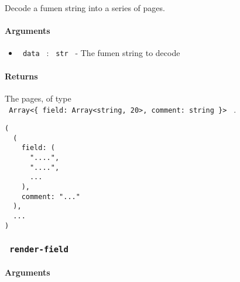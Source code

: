 Decode a fumen string into a series of pages.

\paragraph{Arguments}\label{arguments}

\begin{itemize}
\tightlist
\item
  \texttt{\ data\ } : \texttt{\ str\ } - The fumen string to decode
\end{itemize}

\paragraph{Returns}\label{returns}

The pages, of type
\texttt{\ Array\textless{}\{\ field:\ Array\textless{}string,\ 20\textgreater{},\ comment:\ string\ \}\textgreater{}\ }
.

\begin{verbatim}
(
  (
    field: (
      "....",
      "....",
      ...
    ),
    comment: "..."
  ),
  ...
)
\end{verbatim}

\subsubsection{\texorpdfstring{\texttt{\ render-field\ }}{ render-field }}\label{render-field}

\paragraph{Arguments}\label{arguments-1}

